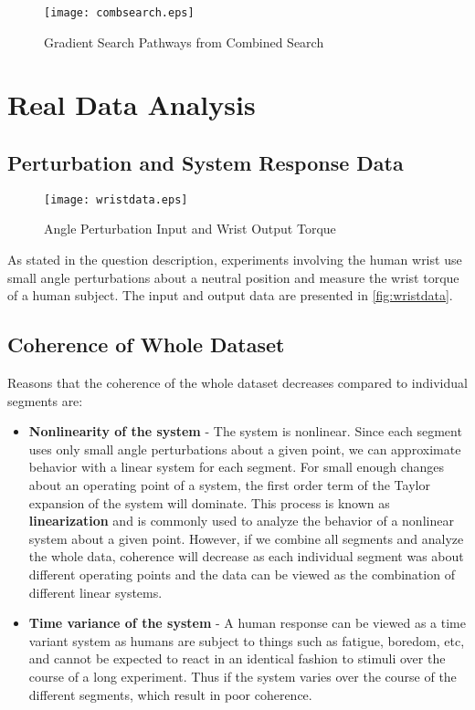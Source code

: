 \documentclass[11pt,a4paper]{article}
\begin{document}
\begin{figure}
    \centering
    \texttt{[image: combsearch.eps]}
    \caption{Gradient Search Pathways from Combined Search}
    \label{fig:combsearch}
\end{figure}

\newpage
{}


\section{Real Data Analysis}

\subsection{Perturbation and System Response Data}
\begin{figure}
    \centering
    \texttt{[image: wristdata.eps]}
    \caption{Angle Perturbation Input and Wrist Output Torque}
    \label{fig:wristdata}
\end{figure}
As stated in the question description, experiments involving the human wrist
use small angle perturbations about a neutral position and measure the wrist
torque of a human subject. The input and output data are presented in
\autoref{fig:wristdata}.


\subsection{Coherence of Whole Dataset}
Reasons that the coherence of the whole dataset decreases compared to
individual segments are:
\begin{itemize}
    \item \textbf{Nonlinearity of the system} - The system is nonlinear. Since
        each segment uses only small angle perturbations about a given point,
        we can approximate behavior with a linear system for each segment. For
        small enough changes about an operating point of a system, the first
        order term of the Taylor expansion of the system will dominate. This
        process is known as \textbf{linearization} and is commonly used to
        analyze the behavior of a nonlinear system about a given point.
        However, if we combine all segments and analyze the whole data,
        coherence will decrease as each individual segment was about different
        operating points and the data can be viewed as the combination of
        different linear systems.
    \item \textbf{Time variance of the system} - A human response can be viewed
        as a time variant system as humans are subject to things such as
        fatigue, boredom, etc, and cannot be expected to react in an identical
        fashion to stimuli over the course of a long experiment. Thus if the
        system varies over the course of the different segments, which result
        in poor coherence.
\end{itemize}
\end{document}
